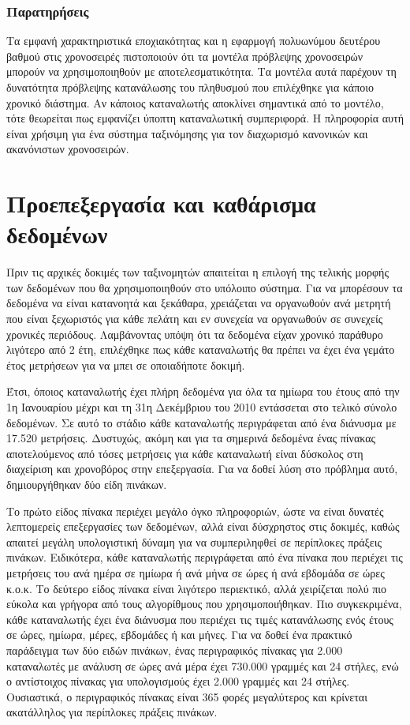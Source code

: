 \subsubsection{Παρατηρήσεις}

Τα εμφανή χαρακτηριστικά εποχιακότητας και η εφαρμογή πολυωνύμου δευτέρου βαθμού στις χρονοσειρές πιστοποιούν ότι τα μοντέλα πρόβλεψης χρονοσειρών μπορούν να χρησιμοποιηθούν με αποτελεσματικότητα. Τα μοντέλα αυτά παρέχουν τη δυνατότητα πρόβλεψης κατανάλωσης του πληθυσμού που επιλέχθηκε για κάποιο χρονικό διάστημα. Αν κάποιος καταναλωτής αποκλίνει σημαντικά από το μοντέλο, τότε θεωρείται πως εμφανίζει ύποπτη καταναλωτική συμπεριφορά. Η πληροφορία αυτή είναι χρήσιμη για ένα σύστημα ταξινόμησης για τον διαχωρισμό κανονικών και ακανόνιστων χρονοσειρών.

\section{Προεπεξεργασία και καθάρισμα δεδομένων}
Πριν τις αρχικές δοκιμές των ταξινομητών απαιτείται η επιλογή της τελικής μορφής των δεδομένων που θα χρησιμοποιηθούν στο υπόλοιπο σύστημα. Για να μπορέσουν τα δεδομένα να είναι κατανοητά και ξεκάθαρα, χρειάζεται να οργανωθούν ανά  μετρητή που είναι ξεχωριστός για κάθε πελάτη και εν συνεχεία να οργανωθούν σε συνεχείς χρονικές περιόδους. Λαμβάνοντας υπόψη ότι τα δεδομένα είχαν χρονικό παράθυρο λιγότερο από 2 έτη, επιλέχθηκε πως κάθε καταναλωτής θα πρέπει να έχει ένα γεμάτο έτος μετρήσεων για να μπει σε οποιαδήποτε δοκιμή.\par
Έτσι, όποιος καταναλωτής έχει πλήρη δεδομένα για όλα τα ημίωρα του έτους από την 1η Ιανουαρίου μέχρι και τη 31η Δεκέμβριου του 2010 εντάσσεται στο τελικό σύνολο δεδομένων. Σε αυτό το στάδιο κάθε καταναλωτής περιγράφεται από ένα διάνυσμα με 17.520 μετρήσεις. Δυστυχώς, ακόμη και για τα σημερινά δεδομένα ένας πίνακας αποτελούμενος από τόσες μετρήσεις για κάθε καταναλωτή είναι δύσκολος στη διαχείριση και χρονοβόρος στην επεξεργασία. Για να δοθεί λύση στο πρόβλημα αυτό, δημιουργήθηκαν δύο είδη πινάκων.\par
Το πρώτο είδος πίνακα περιέχει μεγάλο όγκο πληροφοριών, ώστε να είναι δυνατές λεπτομερείς επεξεργασίες των δεδομένων, αλλά είναι δύσχρηστος στις δοκιμές, καθώς απαιτεί μεγάλη υπολογιστική δύναμη για να συμπεριληφθεί σε περίπλοκες πράξεις πινάκων. Ειδικότερα, κάθε καταναλωτής περιγράφεται από ένα πίνακα που περιέχει τις μετρήσεις του ανά ημέρα σε ημίωρα ή ανά μήνα σε ώρες ή ανά εβδομάδα σε ώρες κ.ο.κ. Το δεύτερο είδος πίνακα είναι λιγότερο περιεκτικό, αλλά χειρίζεται πολύ πιο εύκολα και γρήγορα από τους αλγορίθμους που χρησιμοποιήθηκαν. Πιο συγκεκριμένα, κάθε καταναλωτής έχει ένα διάνυσμα που περιέχει τις τιμές κατανάλωσης ενός έτους σε ώρες, ημίωρα, μέρες, εβδομάδες ή και μήνες. Για να δοθεί ένα πρακτικό παράδειγμα των δύο ειδών πινάκων, ένας περιγραφικός πίνακας για 2.000 καταναλωτές με ανάλυση σε ώρες ανά μέρα έχει 730.000 γραμμές και 24 στήλες, ενώ ο αντίστοιχος πίνακας για υπολογισμούς έχει 2.000 γραμμές και 24 στήλες. Ουσιαστικά, ο περιγραφικός πίνακας είναι 365 φορές μεγαλύτερος και κρίνεται ακατάλληλος για περίπλοκες πράξεις πινάκων.\par
